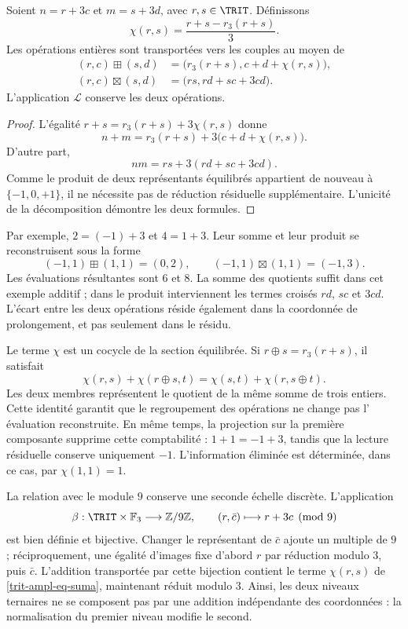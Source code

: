 \begin{proposition}
\label{trit-ampl-prop-aritmetica}
Soient \(n=r+3c\) et \(m=s+3d\), avec \(r,s\in\TRIT\). Définissons
\[
 \chi(r,s)=\frac{r+s-r_3(r+s)}3.
\]
Les opérations entières sont transportées vers les couples au moyen de
\begin{align}
 (r,c)\boxplus(s,d)
 &=\bigl(r_3(r+s),c+d+\chi(r,s)\bigr),
 \label{trit-ampl-eq-suma}\\
 (r,c)\boxtimes(s,d)
 &=\bigl(rs,rd+sc+3cd\bigr).
 \label{trit-ampl-eq-producto}
\end{align}
L'application \(\mathcal L\) conserve les deux opérations.
\end{proposition}
\begin{proof}
L'égalité \(r+s=r_3(r+s)+3\chi(r,s)\) donne
\[
 n+m=r_3(r+s)+3\bigl(c+d+\chi(r,s)\bigr).
\]
D'autre part,
\[
 nm=rs+3(rd+sc+3cd).
\]
Comme le produit de deux représentants équilibrés appartient de nouveau à
\(\{-1,0,+1\}\), il ne nécessite pas de réduction résiduelle supplémentaire. L'unicité
de la décomposition démontre les deux formules.
\end{proof}

Par exemple, \(2=(-1)+3\) et \(4=1+3\). Leur somme et leur produit se reconstruisent
sous la forme
\[
 (-1,1)\boxplus(1,1)=(0,2),\qquad
 (-1,1)\boxtimes(1,1)=(-1,3).
\]
Les évaluations résultantes sont \(6\) et \(8\). La somme des quotients suffit
dans cet exemple additif ; dans le produit interviennent les termes croisés
\(rd\), \(sc\) et \(3cd\). L'écart entre les deux opérations réside
également dans la coordonnée de prolongement, et pas seulement dans le résidu.

Le terme \(\chi\) est un cocycle de la section équilibrée. Si
\(r\oplus s=r_3(r+s)\), il satisfait
\[
 \chi(r,s)+\chi(r\oplus s,t)
 =\chi(s,t)+\chi(r,s\oplus t).
\]
Les deux membres représentent le quotient de la même somme de trois entiers.
Cette identité garantit que le regroupement des opérations ne change pas l'
évaluation reconstruite. En même temps, la projection sur la première
composante supprime cette comptabilité : \(1+1=-1+3\), tandis que la lecture
résiduelle conserve uniquement \(-1\). L'information éliminée est
déterminée, dans ce cas, par \(\chi(1,1)=1\).

La relation avec le module \(9\) conserve une seconde échelle discrète. L'application
\[
 \beta:\TRIT\times\mathbb F_3\longrightarrow\mathbb Z/9\mathbb Z,
 \qquad (r,\bar c)\longmapsto r+3c\pmod9
\]
est bien définie et bijective. Changer le représentant de \(\bar c\) ajoute un multiple de \(9\) ; réciproquement, une égalité d'images fixe d'abord \(r\) par réduction modulo \(3\), puis \(\bar c\). L'addition transportée par cette bijection contient le terme \(\chi(r,s)\) de \eqref{trit-ampl-eq-suma}, maintenant réduit modulo \(3\). Ainsi, les deux niveaux ternaires ne se composent pas par une addition indépendante des coordonnées : la normalisation du premier niveau modifie le second.

